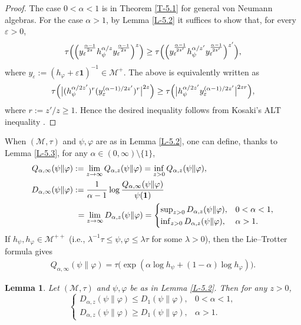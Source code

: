 \documentclass[12pt]{article}
\newtheorem{lemma}[theorem]{Lemma}
\theoremstyle{definition}
\theoremstyle{remark}
\numberwithin{equation}{section}
\def\Me{\mathcal M}
\def\ffi{\varphi}
\def\1{\mathbf{1}}
\def\eps{\varepsilon}
\begin{document}
\begin{proof}
The case $0<\alpha<1$ is in Theorem \ref{T-5.1} for general von Neumann algebras.
For the case $\alpha>1$, by Lemma \ref{L-5.2} it suffices to show that, for every $\eps>0$,
\[
\tau\Bigl(\Bigl(y_\eps^{\alpha-1\over2z}h_\psi^{\alpha/z}y_\eps^{\alpha-1\over2z}\Bigr)^z\Bigr)
\ge\tau\Bigl(\Bigl(y_\eps^{\alpha-1\over2z'}h_\psi^{\alpha/z'}y_\eps^{\alpha-1\over2z'}\Bigr)^{z'}\Bigr),
\]
where $y_\eps:=(h_\ffi+\eps\1)^{-1}\in\Me^+$. The above is equivalently written as
\[
\tau\Bigl(\big|(h_\psi^{\alpha/2z'})^r(y_\eps^{(\alpha-1)/2z'})^r\big|^{2z}\Bigr)
\ge\tau\Bigl(\big|h_\psi^{\alpha/2z'} y_\eps^{(\alpha-1)/2z'}\big|^{2zr}\Bigr),
\]
where $r:=z'/z\ge1$. Hence the desired inequality follows from Kosaki's ALT inequality
\cite[Corollary 3]{kosaki1992aninequality}.
\end{proof}

When $(\Me,\tau)$ and $\psi,\ffi$ are as in Lemma \ref{L-5.2}, one can define, thanks to
Lemma \ref{L-5.3}, for any $\alpha\in(0,\infty)\setminus\{1\}$,
\begin{align}
Q_{\alpha,\infty}(\psi\|\ffi)&:=\lim_{z\to\infty}Q_{\alpha,z}(\psi\|\ffi)
=\inf_{z>0}Q_{\alpha,z}(\psi\|\ffi), \nonumber\\
D_{\alpha,\infty}(\psi\|\ffi)&:={1\over\alpha-1}\log{Q_{\alpha,\infty}(\psi\|\ffi)\over\psi(\1)} \nonumber\\
&\ =\lim_{z\to\infty}D_{\alpha,z}(\psi\|\ffi)
=\begin{cases}\sup_{z>0}D_{\alpha,z}(\psi\|\ffi), & \text{$0<\alpha<1$},\\
\inf_{z>0}D_{\alpha,z}(\psi\|\ffi), & \text{$\alpha>1$}.\end{cases} \label{F-6.10}
\end{align}
If $h_\psi,h_\ffi\in\Me^{++}$ (i.e., $\lambda^{-1}\tau\le\psi,\ffi\le\lambda\tau$ for some $\lambda>0$), then
the Lie--Trotter formula gives
\begin{align}\label{F-6.11}
Q_{\alpha,\infty}(\psi\|\ffi)=\tau\bigl(\exp(\alpha\log h_\psi+(1-\alpha)\log h_\ffi)\bigr).
\end{align}

\begin{lemma}\label{L-5.4}
Let $(\Me,\tau)$ and $\psi,\ffi$ be as in Lemma \ref{L-5.2}. Then for any $z>0$,
\[
\begin{cases}
D_{\alpha,z}(\psi\|\ffi)\le D_1(\psi\|\ffi), & \text{$0<\alpha<1$},\\
D_{\alpha,z}(\psi\|\ffi)\ge D_1(\psi\|\ffi), & \text{$\alpha>1$}.
\end{cases}
\]
\end{lemma}
\end{document}
